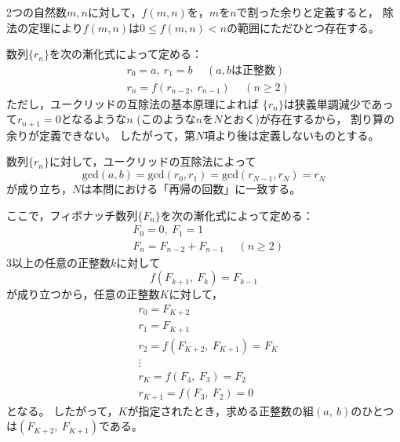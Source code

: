 \documentclass{article}
\begin{document}
2つの自然数$m, n$に対して，$f(m, n)$を，$m$を$n$で割った余りと定義すると，
除法の定理により$f(m, n)$は$0 \leq f(m, n) < n$の範囲にただひとつ存在する。

数列$\{r_n\}$を次の漸化式によって定める：
\begin{eqnarray*}
    &r_0 = a,\ r_1 = b \hspace{15pt} (\mbox{$a, b$は正整数}) \\
    &r_n = f(r_{n - 2},\ r_{n - 1}) \hspace{15pt} (n \geq 2)
\end{eqnarray*}
ただし，ユークリッドの互除法の基本原理によれば
$\{r_n\}$は狭義単調減少であって$r_{n + 1} = 0$となるような$n$ (このような$n$を$N$とおく)が存在するから，
割り算の余りが定義できない。
したがって，第$N$項より後は定義しないものとする。

数列$\{r_n\}$に対して，ユークリッドの互除法によって
\begin{equation*}
    \mathrm{gcd}(a, b)
    = \mathrm{gcd}(r_0, r_1)
    = \mathrm{gcd}(r_{N - 1}, r_{N})
    = r_{N}
\end{equation*}
が成り立ち，$N$は本問における「再帰の回数」に一致する。

ここで，フィボナッチ数列$\{F_n\}$を次の漸化式によって定める：
\begin{eqnarray*}
    &F_0 = 0,\ F_1 = 1 \\
    &F_n = F_{n - 2} + F_{n - 1} \hspace{15pt} (n \geq 2)
\end{eqnarray*}
3以上の任意の正整数$k$に対して
\begin{equation*}
    f(F_{k + 1},\ F_{k}) = F_{k - 1}
\end{equation*}
が成り立つから，任意の正整数$K$に対して，
\begin{eqnarray*}
    &r_0 = F_{K + 2} \\
    &r_1 = F_{K + 1} \\
    &r_2 = f(F_{K + 2},\ F_{K + 1}) = F_{K} \\
    &\vdots \\
    &r_K = f(F_{4},\ F_{3}) = F_2 \\
    &r_{K + 1} = f(F_{3},\ F_{2}) = 0
\end{eqnarray*}
となる。
したがって，$K$が指定されたとき，求める正整数の組$(a,\ b)$のひとつは$(F_{K + 2},\ F_{K + 1})$である。
\end{document}
